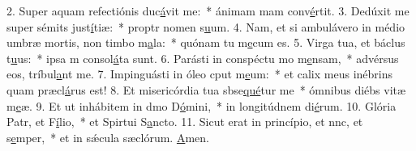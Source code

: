 2. Super aquam refectiónis duc\uline{á}vit me:~* ánimam mam conv\uline{é}rtit.
3. Dedúxit me super sémits just\uline{í}tiæ:~* proptr nomen s\uline{u}um.
4. Nam, et si ambulávero in médio umbræ mortis, non timbo m\uline{a}la:~* quónam tu m\uline{e}cum es.
5. Virga tua, et báclus t\uline{u}us:~* ipsa m consol\uline{á}ta sunt.
6. Parásti in conspéctu mo m\uline{e}nsam,~* advérsus eos,  tríbul\uline{a}nt me.
7. Impinguásti in óleo cput m\uline{e}um:~* et calix meus inébrins quam præcl\uline{á}rus est!
8. Et misericórdia tua sbse\uline{qué}tur me~* ómnibus diébs vitæ m\uline{e}æ.
9. Et ut inhábitem in dmo D\uline{ó}mini,~* in longitúdnem di\uline{é}rum.
10. Glória Patr, et F\uline{í}lio,~* et Spirtui S\uline{a}ncto.
11. Sicut erat in princípio, et nnc, et s\uline{e}mper,~* et in sǽcula sæclórum. \uline{A}men.

